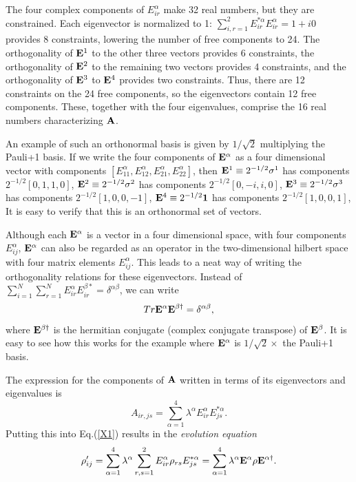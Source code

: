 \documentclass[aps,pra,twocolumn,amssymb, amsfonts,amsmath,showpacs, superscriptaddress]{revtex4}
\begin{document}
The four complex components of
$E_{ir}^{\alpha}$ make 32 real numbers, but they are constrained. Each eigenvector is normalized to 1: $\sum_{i,r=1}^{2}E^{*\alpha}_{ir}E^{\alpha}_{ir}=1+i0$ provides 8 constraints, lowering the number of free components to 24. The orthogonality of ${\bf E}^{1}$ to the other three vectors provides 6 constraints, the orthogonality of ${\bf E}^{2}$ to the remaining two vectors provides 4 constraints, and the orthogonality of ${\bf E}^{3}$ to ${\bf E}^{4}$ provides two constraints. Thus, there are 12 constraints on the 24 free components, so the eigenvectors contain 12 free components.  These, together with the four eigenvalues, comprise the 16 real numbers characterizing ${\bf A}$.


An example of such an orthonormal basis is given by $1/\sqrt{2}$ multiplying the  Pauli+1 basis.    If we write the four components 
of ${\bf E}^{\alpha}$ as a four dimensional vector with components $[E_{11}^{\alpha}, E_{12}^{\alpha},E_{21}^{\alpha},E_{22}^{\alpha}]$, then 
 ${\bf E}^{1}\equiv2^{-1/2}{\bf \sigma}^{1}$ has components $2^{-1/2}[0,1,1,0]$, ${\bf E}^{2}\equiv2^{-1/2}{\bf \sigma}^{2}$ has components $2^{-1/2}[0,-i,i,0]$, ${\bf E}^{3}\equiv2^{-1/2}{\bf \sigma}^{3}$ has components $2^{-1/2}[1,0,0,-1]$, ${\bf E}^{4}\equiv2^{-1/2}{\bf 1}$ has components $2^{-1/2}[1,0,0,1]$,  It is easy to verify that this is an orthonormal set of vectors. 

Although each ${\bf E}^{\alpha}$ is a vector in a four dimensional space, with  four components  $E_{ij}^{\alpha}$,  
 ${\bf E}^{\alpha}$ can also 
be regarded as an operator in the two-dimensional hilbert  space with four matrix elements $E_{ij}^{\alpha}$.  This leads to a neat way of writing the orthogonality relations for these eigenvectors. Instead of 
$\sum_{i=1}^{N}\sum_{r=1}^{N}E_{ir}^{\alpha}E_{ir}^{\beta*}=\delta^{\alpha\beta}$, we can write 
\[
Tr{\bf E}^{\alpha}{\bf E}^{\beta\dagger} =\delta^{\alpha\beta},
\]
\noindent where ${\bf E}^{\beta\dagger}$ is the hermitian conjugate (complex conjugate transpose) of ${\bf E}^{\beta}$.  It is easy to see how 
this works for the example where ${\bf E}^{\alpha}$ is $1/\sqrt{2}\times$ the Pauli+1 basis.   




The expression for the components of ${\bf A}$ written in terms of its eigenvectors and eigenvalues is 
\[
A_{ir,js}=\sum_{\alpha=1}^{4}\lambda^{\alpha}E^{\alpha}_{ir}E^{*\alpha}_{js}.
\]
\noindent Putting this into Eq.(\ref{X1}) results in the \textit{evolution equation}
\[
\rho'_{ij}=\sum_{\alpha=1}^{4}\lambda^{\alpha}\sum_{r,s=1}^{2}E^{\alpha}_{ir}\rho_{rs}E^{*\alpha}_{js}=\sum_{\alpha=1}^{4}\lambda^{\alpha}{\bf E}^{\alpha}{\bf\rho} {\bf E}^{\alpha\dagger}.  
\]
\end{document}
